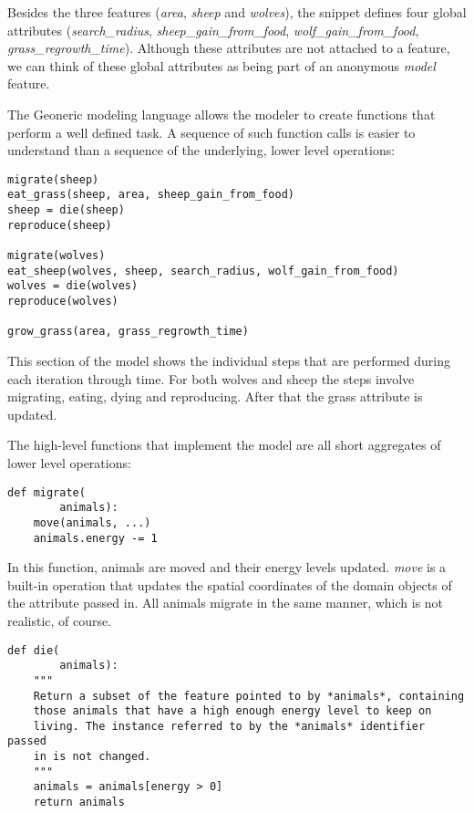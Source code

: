 \documentclass[10pt, a4paper]{article}
\begin{document}
Besides the three features (\emph{area}, \emph{sheep} and \emph{wolves}), the snippet defines four global attributes (\emph{search\_radius}, \emph{sheep\_gain\_from\_food}, \emph{wolf\_gain\_from\_food}, \emph{grass\_regrowth\_time}). Although these attributes are not attached to a feature, we can think of these global attributes as being part of an anonymous \emph{model} feature.


The Geoneric modeling language allows the modeler to create functions that perform a well defined task. A sequence of such function calls is easier to understand than a sequence of the underlying, lower level operations:

\begin{lstlisting}
migrate(sheep)
eat_grass(sheep, area, sheep_gain_from_food)
sheep = die(sheep)
reproduce(sheep)

migrate(wolves)
eat_sheep(wolves, sheep, search_radius, wolf_gain_from_food)
wolves = die(wolves)
reproduce(wolves)

grow_grass(area, grass_regrowth_time)
\end{lstlisting}

This section of the model shows the individual steps that are performed during each iteration through time. For both wolves and sheep the steps involve migrating, eating, dying and reproducing. After that the grass attribute is updated.

The high-level functions that implement the model are all short aggregates of lower level operations:

\begin{lstlisting}
def migrate(
        animals):
    move(animals, ...)
    animals.energy -= 1
\end{lstlisting}

In this function, animals are moved and their energy levels updated. \emph{move} is a built-in operation that updates the spatial coordinates of the domain objects of the attribute passed in. All animals migrate in the same manner, which is not realistic, of course.

\begin{lstlisting}
def die(
        animals):
    """
    Return a subset of the feature pointed to by *animals*, containing
    those animals that have a high enough energy level to keep on
    living. The instance referred to by the *animals* identifier passed
    in is not changed.
    """
    animals = animals[energy > 0]
    return animals
\end{lstlisting}
\end{document}
